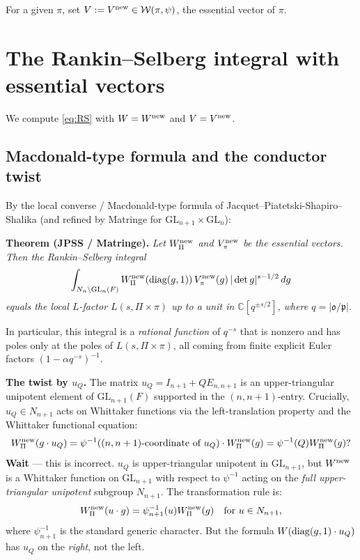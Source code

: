For a given $\pi$, set $V:=V^{\rm new}\in\mathcal W(\pi,\psi)$, the essential vector of $\pi$.

\section*{The Rankin--Selberg integral with essential vectors}

We compute \eqref{eq:RS} with $W=W^{\rm new}$ and $V=V^{\rm new}$.

\subsection*{Macdonald-type formula and the conductor twist}

By the local converse / Macdonald-type formula of Jacquet--Piatetski-Shapiro--Shalika \cite{JPSS81} (and refined by Matringe \cite{Matringe} for $\mathrm{GL}_{n+1}\times\mathrm{GL}_n$):

\medskip
\noindent\textbf{Theorem (JPSS / Matringe).}  \emph{Let $W^{\rm new}_\Pi$ and $V^{\rm new}_\pi$ be the essential vectors.  Then the Rankin--Selberg integral
\[
\int_{N_n\backslash\mathrm{GL}_n(F)} W^{\rm new}_\Pi(\operatorname{diag}(g,1))\,V^{\rm new}_\pi(g)\,|\det g|^{s-1/2}\,dg
\]
equals the local $L$-factor $L(s,\Pi\times\pi)$ up to a unit in $\mathbb C[q^{\pm s/2}]$, where $q=|\mathfrak o/\mathfrak p|$.}

In particular, this integral is a \emph{rational function} of $q^{-s}$ that is nonzero and has poles only at the poles of $L(s,\Pi\times\pi)$, all coming from finite explicit Euler factors $(1-\alpha q^{-s})^{-1}$.

\medskip
\noindent\textbf{The twist by $u_Q$.}  The matrix $u_Q=I_{n+1}+QE_{n,n+1}$ is an upper-triangular unipotent element of $\mathrm{GL}_{n+1}(F)$ supported in the $(n,n+1)$-entry.  Crucially, $u_Q\in N_{n+1}$ acts on Whittaker functions via the left-translation property and the Whittaker functional equation:
\[
W^{\rm new}_\Pi(g\cdot u_Q) = \psi^{-1}(\text{$(n,n+1)$-coordinate of }u_Q)\cdot W^{\rm new}_\Pi(g) = \psi^{-1}(Q)W^{\rm new}_\Pi(g)?
\]
\textbf{Wait} — this is incorrect.  $u_Q$ is upper-triangular unipotent in $\mathrm{GL}_{n+1}$, but $W^{\rm new}$ is a Whittaker function on $\mathrm{GL}_{n+1}$ with respect to $\psi^{-1}$ acting on the \emph{full upper-triangular unipotent} subgroup $N_{n+1}$.  The transformation rule is:
\[
W^{\rm new}_\Pi(u\cdot g)=\psi_{n+1}^{-1}(u)W^{\rm new}_\Pi(g)\quad\text{for }u\in N_{n+1},
\]
where $\psi_{n+1}^{-1}$ is the standard generic character.  But the formula $W(\operatorname{diag}(g,1)\cdot u_Q)$ has $u_Q$ on the \emph{right}, not the left.

